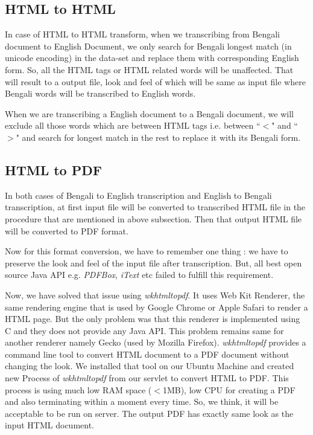 \documentclass[12pt,oneside,openany,a4paper]{book}
\begin{document}
\subsection{HTML to HTML}
In case of HTML to HTML transform, when we transcribing from Bengali document to English Document, we only search for Bengali longest match (in unicode encoding) in the data-set and replace them with corresponding English form. So, all the HTML tags or HTML related words will be unaffected. That will result to a output file, look and feel of which will be same as input file where Bengali words will be transcribed to English words.

When we are transcribing a English document to a Bengali document, we will exclude all those words which are between HTML tags i.e. between ``$<$" and ``$>$"  and search for longest match in the rest to replace it with its Bengali form.

\subsection{HTML to PDF}
In both cases of Bengali to English transcription and English to Bengali transcription, at first input file will be converted to transcribed HTML file in the procedure that are mentioned in above subsection. Then that output HTML file will be converted to PDF format.

Now for this format conversion, we have to remember one thing : we have to preserve the look and feel of the input file after transcription. But, all best open source Java API e.g. \emph{PDFBox}, \emph{iText} etc failed to fulfill this requirement.

Now, we have solved that issue using \emph{wkhtmltopdf}. It uses Web Kit Renderer, the same rendering engine that is used by Google Chrome or Apple Safari to render a HTML page. But the only problem was that this renderer is implemented using C and they does not provide any Java API. This problem remains same for another renderer namely Gecko (used by Mozilla Firefox). \emph{wkhtmltopdf} provides a command line tool to convert HTML document to a PDF document without changing the look. We installed that tool on our Ubuntu Machine and created new Process of \emph{wkhtmltopdf} from our servlet to convert HTML to PDF. This process is using much low RAM space ($<$1MB), low CPU for creating a PDF and also terminating within a moment every time. So, we think, it will be acceptable to be run on server. The output PDF has exactly same look as the input HTML document. 
\end{document}
